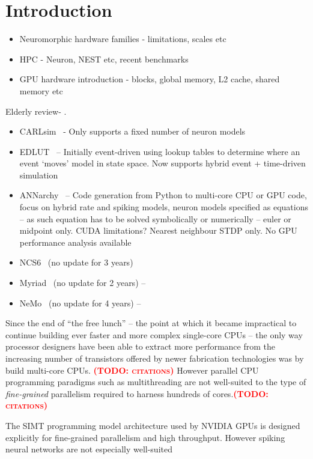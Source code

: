 \documentclass[utf8]{frontiersSCNS} %
\newcommand{\todo}[1]{\textbf{\textsc{\textcolor{red}{(TODO: #1)}}}}
\begin{document}
\section{Introduction}

\begin{itemize}
    \item Neuromorphic hardware families - limitations, scales etc
    \item HPC - Neuron, NEST etc, recent benchmarks
    \item GPU hardware introduction - blocks, global memory, L2 cache, shared memory etc
\end{itemize}

Elderly review- \citep{Brette2012}.
\begin{itemize}
    \item CARLsim~\citep{Chou2018} - Only supports a fixed number of neuron models
    \item EDLUT~\citep{Garrido2011} -- Initially event-driven using lookup tables to determine where an event `moves' model in state space. Now supports hybrid event + time-driven simulation
    \item ANNarchy~\citep{Vitay2015} -- Code generation from Python to multi-core CPU or GPU code, focus on hybrid rate and spiking models, neuron models specified as equations -- as such equation has to be solved symbolically or numerically -- euler or midpoint only. CUDA limitations? Nearest neighbour STDP only. No GPU performance analysis available
    \item NCS6~\citep{Hoang2013} (no update for 3 years)
    \item Myriad~\citep{Rittner2016} (no update for 2 years) -- 
    \item NeMo~\citep{Fidjeland2009} (no update for 4 years) -- 
\end{itemize}
Since the end of ``the free lunch'' -- the point at which it became impractical to continue building ever faster and more complex single-core CPUs -- the only way processor designers have been able to extract more performance from the increasing number of transistors offered by newer fabrication technologies was by build multi-core CPUs. \todo{citations}
However parallel CPU programming paradigms such as multithreading are not well-suited to the type of \textit{fine-grained} parallelism required to harness hundreds of cores.\todo{citations}

The SIMT programming model architecture used by NVIDIA GPUs is designed explicitly for fine-grained parallelism and high throughput.
However spiking neural networks are not especially well-suited
\end{document}
